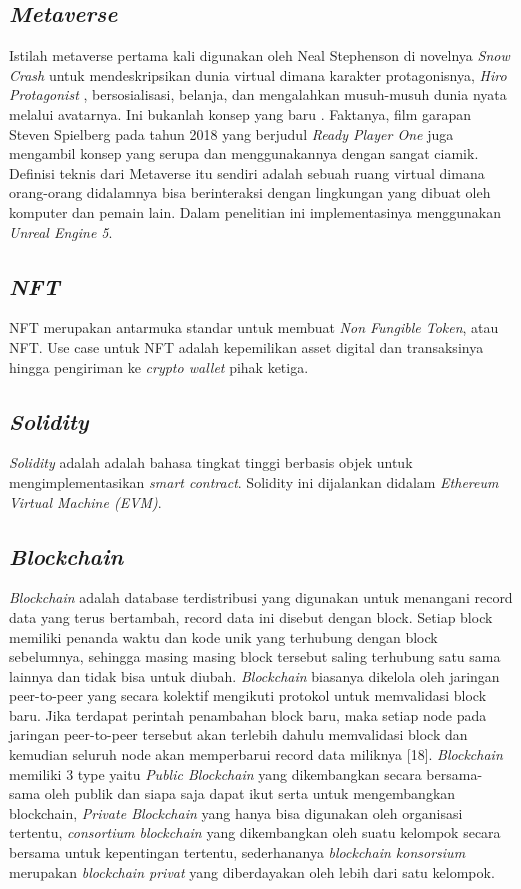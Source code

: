 \subsection{\emph{Metaverse}}

Istilah metaverse pertama kali digunakan oleh Neal Stephenson di novelnya \emph{Snow Crash} untuk
mendeskripsikan dunia virtual dimana karakter protagonisnya, \emph{Hiro Protagonist}
, bersosialisasi, belanja, dan mengalahkan musuh-musuh dunia nyata melalui avatarnya. Ini bukanlah konsep yang baru
. Faktanya, film garapan Steven Spielberg pada tahun 2018 yang berjudul \emph{Ready Player One} juga mengambil konsep yang serupa dan
menggunakannya dengan sangat ciamik. Definisi teknis dari Metaverse itu sendiri adalah sebuah ruang virtual dimana orang-orang didalamnya bisa berinteraksi
dengan lingkungan yang dibuat oleh komputer dan pemain lain. Dalam penelitian ini implementasinya menggunakan
\emph{Unreal Engine 5}.

\subsection{\emph{NFT}}
NFT merupakan antarmuka standar untuk membuat \emph{Non Fungible Token}, atau NFT.
Use case untuk NFT adalah kepemilikan asset digital dan transaksinya hingga pengiriman ke
\emph{crypto wallet} pihak ketiga.

\subsection{\emph{Solidity}}
\emph{Solidity} adalah adalah bahasa tingkat tinggi berbasis objek untuk mengimplementasikan
\emph{smart contract}. Solidity ini dijalankan didalam \emph{Ethereum Virtual Machine (EVM)}.


\subsection{\emph{Blockchain}}

\emph{Blockchain} adalah database terdistribusi yang digunakan
untuk menangani record data yang terus bertambah, record data ini
disebut dengan block. Setiap block memiliki penanda waktu dan
kode unik yang terhubung dengan block sebelumnya, sehingga masing
masing block tersebut saling terhubung satu sama lainnya dan
tidak bisa untuk diubah. \emph{Blockchain} biasanya dikelola oleh jaringan
peer-to-peer yang secara kolektif mengikuti protokol untuk
memvalidasi block baru. Jika terdapat perintah penambahan block baru,
maka setiap node pada jaringan peer-to-peer tersebut akan terlebih
dahulu memvalidasi block dan kemudian seluruh node akan memperbarui record data miliknya [18]. \emph{Blockchain} memiliki 3 type \parencite{url:blockchaintype}
yaitu \emph{Public Blockchain} yang dikembangkan secara bersama-sama
oleh publik dan siapa saja dapat ikut serta untuk mengembangkan
blockchain, \emph{Private Blockchain} yang hanya bisa digunakan oleh
organisasi tertentu, \emph{consortium blockchain} yang dikembangkan oleh
suatu kelompok secara bersama untuk kepentingan tertentu,
sederhananya \emph{blockchain konsorsium} merupakan \emph{blockchain privat} yang
diberdayakan oleh lebih dari satu kelompok.

